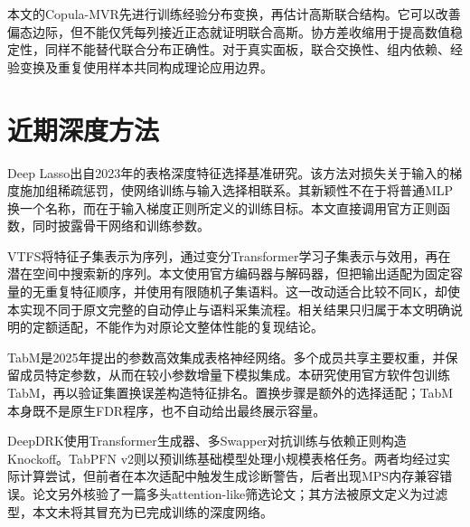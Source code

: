 \documentclass{sufethesismas}
\begin{document}
本文的Copula-MVR先进行训练经验分布变换，再估计高斯联合结构。它可以改善偏态边际，但不能仅凭每列接近正态就证明联合高斯。协方差收缩用于提高数值稳定性\cite{ledoit2004}，同样不能替代联合分布正确性。对于真实面板，联合交换性、组内依赖、经验变换及重复使用样本共同构成理论应用边界。

\section{近期深度方法}

Deep Lasso出自2023年的表格深度特征选择基准研究\cite{deeplasso2023}。该方法对损失关于输入的梯度施加组稀疏惩罚，使网络训练与输入选择相联系。其新颖性不在于将普通MLP换一个名称，而在于输入梯度正则所定义的训练目标。本文直接调用官方正则函数，同时披露骨干网络和训练参数。

VTFS将特征子集表示为序列，通过变分Transformer学习子集表示与效用，再在潜在空间中搜索新的序列\cite{vtfs2024}。本文使用官方编码器与解码器，但把输出适配为固定容量的无重复特征顺序，并使用有限随机子集语料。这一改动适合比较不同K，却使本实现不同于原文完整的自动停止与语料采集流程。相关结果只归属于本文明确说明的定额适配，不能作为对原论文整体性能的复现结论。

TabM是2025年提出的参数高效集成表格神经网络\cite{tabm2025}。多个成员共享主要权重，并保留成员特定参数，从而在较小参数增量下模拟集成。本研究使用官方软件包训练TabM，再以验证集置换误差构造特征排名。置换步骤是额外的选择适配；TabM本身既不是原生FDR程序，也不自动给出最终展示容量。

DeepDRK使用Transformer生成器、多Swapper对抗训练与依赖正则构造Knockoff\cite{deepdrk2024}。TabPFN v2则以预训练基础模型处理小规模表格任务\cite{tabpfn2025}。两者均经过实际计算尝试，但前者在本次适配中触发生成诊断警告，后者出现MPS内存兼容错误。论文另外核验了一篇多头attention-like筛选论文\cite{mafs2024}；其方法被原文定义为过滤型，本文未将其冒充为已完成训练的深度网络。
\end{document}
